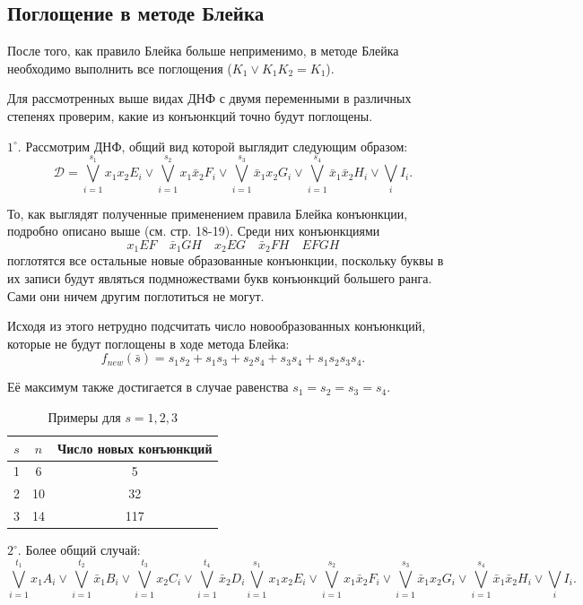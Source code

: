 \documentclass[12pt,a4paper,oneside,fleqn,leqno]{article}
\theoremstyle{definition}
\begin{document}
		\subsection{Поглощение в методе Блейка}
			После того, как правило Блейка больше неприменимо, в методе Блейка необходимо выполнить все поглощения ($K_1 \vee K_1K_2 = K_1$).\par
			Для рассмотренных выше видах ДНФ с двумя переменными в различных степенях проверим, какие из конъюнкций точно будут поглощены.\par
			$1^{\circ}.$ Рассмотрим ДНФ, общий вид которой выглядит следующим образом:
			$$
				\mathcal{D} = \bigvee_{i = 1}^{s_1}x_1x_2E_i \vee \bigvee_{i = 1}^{s_2}x_1\bar{x}_2F_i \vee \bigvee_{i = 1}^{s_3}\bar{x}_1x_2G_i \vee \bigvee_{i = 1}^{s_4}\bar{x}_1\bar{x}_2H_i \vee \bigvee_iI_i.
			$$\par
			То, как выглядят полученные применением правила Блейка конъюнкции, подробно описано выше (см. стр. 18-19). Среди них конъюнкциями
			$$x_1EF\quad \bar{x}_1GH \quad x_2EG \quad \bar{x}_2FH \quad EFGH$$
			поглотятся все остальные новые образованные конъюнкции, поскольку буквы в их записи будут являться подмножествами букв конъюнкций большего ранга. Сами они ничем другим поглотиться не могут.\par
			Исходя из этого нетрудно подсчитать число новообразованных конъюнкций, которые не будут поглощены в ходе метода Блейка:
			$$
				f_{new}(\bar{s}) = s_1s_2 + s_1s_3 + s_2s_4 + s_3s_4 + s_1s_2s_3s_4.
			$$\par
			Её максимум также достигается в случае равенства $s_1 = s_2 = s_3 = s_4.$
\par
			\begin{table}[H]
				\centering
				\begin{tabular}{|c|c|c|}
					\hline
					$s$ & $n$ & Число новых конъюнкций\\
					\hline
					1 & 6 & 5\\
					\hline
					2 & 10 & 32\\
					\hline
					3 & 14 & 117\\
					\hline
				\end{tabular}
				\caption*{Примеры для $s = 1, 2, 3$}
			\end{table}\par
			$2^{\circ}.$ Более общий случай:
			$$
				\bigvee_{i = 1}^{t_1}x_1A_i \vee \bigvee_{i = 1}^{t_2}\bar{x}_1B_i \vee \bigvee_{i = 1}^{t_3}x_2C_i \vee \bigvee_{i = 1}^{t_4}\bar{x}_2D_i \bigvee_{i = 1}^{s_1}x_1x_2E_i \vee \bigvee_{i = 1}^{s_2}x_1\bar{x}_2F_i \vee \bigvee_{i = 1}^{s_3}\bar{x}_1x_2G_i \vee \bigvee_{i = 1}^{s_4}\bar{x}_1\bar{x}_2H_i \vee \bigvee_iI_i.
			$$\par
\end{document}
